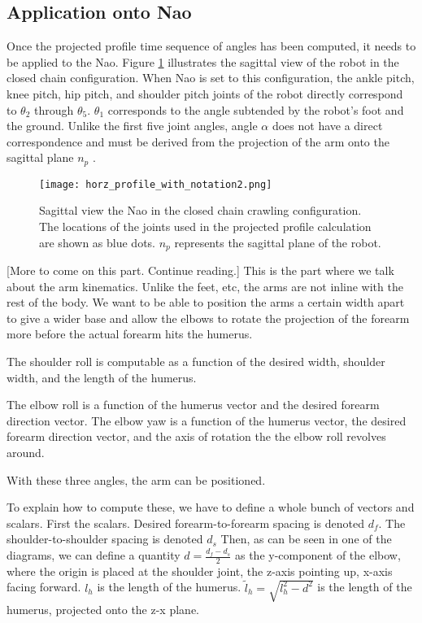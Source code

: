 \subsection{Application onto Nao}
Once the projected profile time sequence of angles has been computed, it needs to be applied to the Nao.
Figure \ref{fig:nao_pp_view1} illustrates the sagittal view of the robot in the closed chain configuration.
When Nao is set to this configuration, the ankle pitch, knee pitch, hip pitch, and shoulder pitch joints 
of the robot directly correspond to $\theta_2$ through $\theta_5$. $\theta_1$ corresponds to the angle
subtended by the robot's foot and the ground. Unlike the first five joint angles, angle $\alpha$ does not have a
direct correspondence and must be derived from the projection of the arm onto the sagittal plane $n_p$ . 

\begin{figure}
	\texttt{[image: horz\_profile\_with\_notation2.png]}
  	\caption{Sagittal view the Nao in the closed chain crawling configuration. 
  				The locations of the joints used in the projected profile calculation are shown as blue dots. 
  				$n_p$ represents the sagittal plane of the robot.
  			}
  	\label{fig:nao_pp_view1}
\end{figure}

[More to come on this part. Continue reading.]
This is the part where we talk about the arm kinematics.
Unlike the feet, etc, the arms are not inline with the rest of the body.
We want to be able to position the arms a certain width apart to give a wider base and allow the elbows to
rotate the projection of the forearm more before the actual forearm hits the humerus.

The shoulder roll is computable as a function of the desired width, shoulder width, and the length of the humerus.

The elbow roll is a function of the humerus vector and the desired forearm direction vector.
The elbow yaw is a function of the humerus vector, the desired forearm direction vector, and the axis of rotation
the the elbow roll revolves around.

With these three angles, the arm can be positioned.

To explain how to compute these, we have to define a whole bunch of vectors and scalars.
First the scalars.
Desired forearm-to-forearm spacing is denoted $d_f$.
The shoulder-to-shoulder spacing is denoted $d_s$
Then, as can be seen in one of the diagrams, we can define a quantity
$d = \frac{d_f - d_s}{2}$ as the y-component of the elbow, where the origin is placed at the shoulder joint,
the z-axis pointing up, x-axis facing forward.
$l_h$ is the length of the humerus.
$\tilde l_h = \sqrt{l_h^2 - d^2}$ is the length of the humerus, projected onto the z-x plane.

